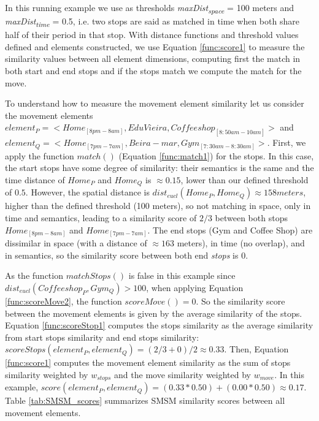 \documentclass[12pt]{article}
\begin{document}
In this running example we use as thresholds \textit{maxDist\textsubscript{space}} = 100 meters and \textit{maxDist\textsubscript{time}} = 0.5, i.e. two stops are said as matched in time when both share half of their period in that stop.
With distance functions and threshold values defined and elements constructed, we use Equation \ref{func:score1} to measure the similarity values between all element dimensions, computing first the match in both start and end stops and if the stops match we compute the match for the move. 

To understand how to measure the movement element similarity let us consider the movement elements $element_{P}=<Home_{[8pm-8am]},Edu Vieira,Coffee shop_{[8:50am-10am]}>$ and $element_{Q}=<Home_{[7pm-7am]},Beira-mar,Gym_{[7:30am-8:30am]}>$. First, we apply the function $match()$ (Equation \ref{func:match1}) for the stops. In this case, the start stops have some degree of similarity: their semantics is the same and the time distance of $Home_{P}$ and $Home_{Q}$ is $\approx 0.15$, lower than our defined threshold of $0.5$. However, the spatial distance is $dist_{eucl}(Home_{P}, Home_{Q}) \approx 158 meters $, higher than the defined threshold (100 meters), so not matching in space, only in time and semantics, leading to a similarity score of $2/3$ between both stops $Home_{[8pm-8am]}$ and $Home_{[7pm-7am]}$. The end stops (Gym and Coffee Shop) are dissimilar in space (with a distance of $\approx 163$ meters), in time (no overlap), and in semantics, so the similarity score between both end \textit{stops} is $0$.

As the function $matchStops()$ is false in this example since $dist_{eucl}(Coffee shop_{P}, Gym_{Q}) > 100$, when applying Equation \ref{func:scoreMove2}, the function $scoreMove()=0$. So the similarity score between the movement elements is given by the average similarity of the stops. Equation \ref{func:scoreStop1} computes the stops similarity as the average similarity from start stops similarity and end stops similarity: $scoreStops(element_{P}, element_{Q}) = (2/3 + 0) / 2 \approx 0.33$. Then, Equation \ref{func:score1} computes the movement element similarity as the sum of stops similarity weighted by $w_{stops}$ and the move similarity weighted by $w_{move}$. In this example, $score(element_{P}, element_{Q}) = (0.33 * 0.50) + (0.00 * 0.50) \approx 0.17$. Table \ref{tab:SMSM_scores} summarizes SMSM similarity scores between all movement elements.
\end{document}
